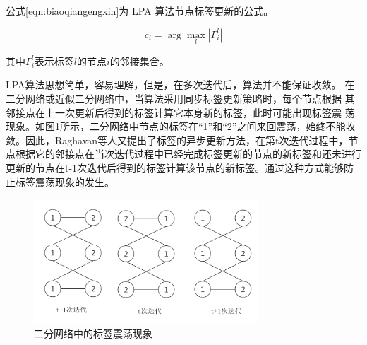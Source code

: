 公式\ref{eqn:biaoqiangengxin}为 LPA 算法节点标签更新的公式。

\begin{equation}
  \label{eqn:biaoqiangengxin}
  c_i=\arg\max_l \left | \Gamma _i^l \right |
\end{equation}

其中$\Gamma _i^l$表示标签$l$的节点$i$的邻接集合。

LPA算法思想简单，容易理解，但是，在多次迭代后，算法并不能保证收敛。
在二分网络或近似二分网络中，当算法采用同步标签更新策略时，每个节点根据
其邻接点在上一次更新后得到的标签计算它本身新的标签，此时可能出现标签震
荡现象。如图\ref{fig:fig3-1}所示，二分网络中节点的标签在“1”和“2”之间来回震荡，始终不能收敛。因此，Raghavan等人\cite{Raghavan2007Near}又提出了标签的异步更新方法，在第t次迭代过程中，节点根据它的邻接点在当次迭代过程中已经完成标签更新的节点的新标签和还未进行更新的节点在t-1次迭代后得到的标签计算该节点的新标签。通过这种方式能够防止标签震荡现象的发生。

\begin{figure}
 \centering
 \includegraphics[width=0.75\textwidth]{figures/fig3-1}
 \caption{二分网络中的标签震荡现象}\label{fig:fig3-1}
\end{figure}

